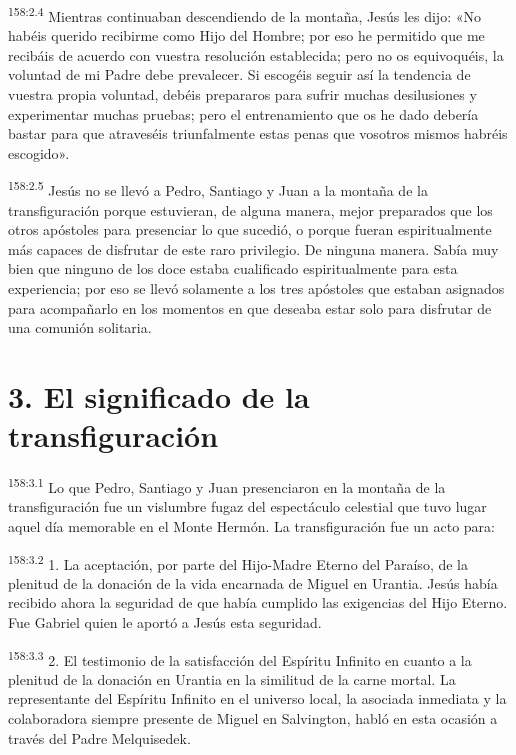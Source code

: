 \par 
\textsuperscript{158:2.4} Mientras continuaban descendiendo de la montaña, Jesús les dijo: «No habéis querido recibirme como Hijo del Hombre; por eso he permitido que me recibáis de acuerdo con vuestra resolución establecida; pero no os equivoquéis, la voluntad de mi Padre debe prevalecer. Si escogéis seguir así la tendencia de vuestra propia voluntad, debéis prepararos para sufrir muchas desilusiones y experimentar muchas pruebas; pero el entrenamiento que os he dado debería bastar para que atraveséis triunfalmente estas penas que vosotros mismos habréis escogido».

\par 
\textsuperscript{158:2.5} Jesús no se llevó a Pedro, Santiago y Juan a la montaña de la transfiguración porque estuvieran, de alguna manera, mejor preparados que los otros apóstoles para presenciar lo que sucedió, o porque fueran espiritualmente más capaces de disfrutar de este raro privilegio. De ninguna manera. Sabía muy bien que ninguno de los doce estaba cualificado espiritualmente para esta experiencia; por eso se llevó solamente a los tres apóstoles que estaban asignados para acompañarlo en los momentos en que deseaba estar solo para disfrutar de una comunión solitaria.

\section*{3. El significado de la transfiguración}
\par 
\textsuperscript{158:3.1} Lo que Pedro, Santiago y Juan presenciaron en la montaña de la transfiguración fue un vislumbre fugaz del espectáculo celestial que tuvo lugar aquel día memorable en el Monte Hermón. La transfiguración fue un acto para:

\par 
\textsuperscript{158:3.2} 1. La aceptación, por parte del Hijo-Madre Eterno del Paraíso, de la plenitud de la donación de la vida encarnada de Miguel en Urantia. Jesús había recibido ahora la seguridad de que había cumplido las exigencias del Hijo Eterno. Fue Gabriel quien le aportó a Jesús esta seguridad.

\par 
\textsuperscript{158:3.3} 2. El testimonio de la satisfacción del Espíritu Infinito en cuanto a la plenitud de la donación en Urantia en la similitud de la carne mortal. La representante del Espíritu Infinito en el universo local, la asociada inmediata y la colaboradora siempre presente de Miguel en Salvington, habló en esta ocasión a través del Padre Melquisedek.

